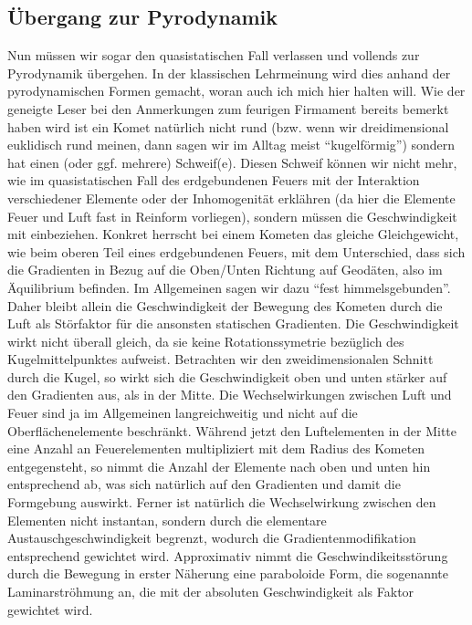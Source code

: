 \documentclass[a5paper,8pt]{book}
\begin{document}
\subsection{Übergang zur Pyrodynamik}

Nun müssen wir sogar den quasistatischen Fall verlassen und vollends zur Pyrodynamik übergehen. In der klassischen 
Lehrmeinung wird dies anhand der pyrodynamischen Formen gemacht, woran auch ich mich hier halten will.
Wie der geneigte Leser bei den Anmerkungen zum feurigen Firmament bereits bemerkt haben wird ist ein Komet natürlich nicht 
rund (bzw. wenn wir dreidimensional euklidisch rund meinen, dann sagen wir im Alltag meist “kugelförmig”) sondern hat einen 
(oder ggf. mehrere) Schweif(e). Diesen Schweif können wir nicht mehr, wie im quasistatischen Fall des erdgebundenen Feuers mit 
der Interaktion verschiedener Elemente oder der Inhomogenität erklähren (da hier die Elemente Feuer und Luft fast in 
Reinform vorliegen), sondern müssen die Geschwindigkeit mit einbeziehen.
Konkret herrscht bei einem Kometen das gleiche Gleichgewicht, wie beim oberen Teil eines erdgebundenen Feuers, mit dem 
Unterschied, dass sich die Gradienten in Bezug auf die Oben/Unten Richtung auf Geodäten, also im Äquilibrium befinden. Im 
Allgemeinen sagen wir dazu “fest himmelsgebunden”.
Daher bleibt allein die Geschwindigkeit der Bewegung des Kometen durch die Luft als Störfaktor für die ansonsten statischen
Gradienten. Die Geschwindigkeit wirkt nicht überall gleich, da sie keine Rotationssymetrie bezüglich des Kugelmittelpunktes 
aufweist. Betrachten wir den zweidimensionalen Schnitt durch die Kugel, so wirkt sich die Geschwindigkeit oben und unten 
stärker auf den Gradienten aus, als in der Mitte. Die Wechselwirkungen zwischen Luft und Feuer sind ja im Allgemeinen 
langreichweitig und nicht auf die Oberflächenelemente beschränkt. Während jetzt den Luftelementen in der Mitte eine Anzahl 
an Feuerelementen multipliziert mit dem Radius des Kometen entgegensteht, so nimmt die Anzahl der Elemente nach oben und 
unten hin entsprechend ab, was sich natürlich auf den Gradienten und damit die Formgebung auswirkt. Ferner ist natürlich 
die Wechselwirkung zwischen den Elementen nicht instantan, sondern durch die elementare Austauschgeschwindigkeit begrenzt, 
wodurch die Gradientenmodifikation entsprechend 
gewichtet wird.
Approximativ nimmt die Geschwindikeitsstörung durch die Bewegung in erster Näherung eine paraboloide Form, die sogenannte 
Laminarströhmung an, die mit der absoluten Geschwindigkeit als Faktor gewichtet wird.\\
\end{document}

